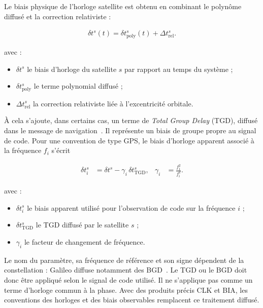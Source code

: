 Le biais physique de l'horloge satellite est obtenu en combinant le polynôme
diffusé et la correction relativiste :

\begin{align}
\delta t^s(t) = \delta t_{\mathrm{poly}}^s(t)
+ \Delta t_{\mathrm{rel}}^s.
\label{eq:broadcast_satellite_clock}
\end{align}

avec :

\begin{itemize}
    \item $\delta t^s$ le biais d'horloge du satellite $s$ par rapport au
    temps du système ;
    \item $\delta t_{\mathrm{poly}}^s$ le terme polynomial diffusé ;
    \item $\Delta t_{\mathrm{rel}}^s$ la correction relativiste liée à
    l'excentricité orbitale.
\end{itemize}

À cela s'ajoute, dans certains cas, un terme de \textit{Total Group Delay}
(TGD), diffusé dans le message de navigation~\cite{isgps200n}. Il représente un biais de groupe propre au signal de code. Pour une
convention de type GPS, le biais d'horloge apparent associé à la fréquence
$f_i$ s'écrit

\begin{align}
\delta t_i^s
&=
\delta t^s-\gamma_i\,\delta t_{\mathrm{TGD}}^s,
&
\gamma_i
&=
\frac{f_1^2}{f_i^2}.
\label{eq:tgd_signal_clock}
\end{align}

avec :

\begin{itemize}
    \item $\delta t_i^s$ le biais apparent utilisé pour l'observation de code
    sur la fréquence $i$ ;
    \item $\delta t_{\mathrm{TGD}}^s$ le TGD diffusé par le satellite $s$ ;
    \item $\gamma_i$ le facteur de changement de fréquence.
\end{itemize}

Le nom du paramètre, sa fréquence de référence et son signe dépendent de la
constellation : Galileo diffuse notamment des BGD~\cite{galileoOsSisIcd21}. Le TGD ou le BGD doit donc
être appliqué selon le signal de code utilisé. Il ne s'applique pas comme un
terme d'horloge commun à la phase. Avec des produits précis CLK et BIA, les
conventions des horloges et des biais observables remplacent ce traitement
diffusé.

